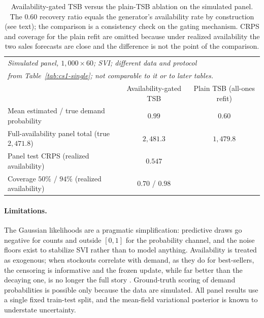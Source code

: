 \begin{table}[t]
\centering
\small
\begin{tabular}{lcc}
\toprule
\multicolumn{3}{l}{\emph{Simulated panel, $1{,}000 \times 60$; SVI; different data and protocol}} \\
\multicolumn{3}{l}{\emph{from Table~\ref{tab:cs1-single}; not comparable to it or to later tables.}} \\
\midrule
 & Availability-gated TSB & Plain TSB (all-ones refit) \\
\midrule
Mean estimated / true demand probability & $0.99$ & $0.60$ \\
Full-availability panel total (true $2{,}471.8$) & $2{,}481.3$ & $1{,}479.8$ \\
Panel test CRPS (realized availability) & $0.547$ & \\
Coverage $50\%$ / $94\%$ (realized availability) & $0.70$ / $0.98$ & \\
\bottomrule
\end{tabular}
\caption{Availability-gated TSB versus the plain-TSB ablation on the simulated panel. The $0.60$ recovery ratio equals the generator's availability rate by construction (see text); the comparison is a consistency check on the gating mechanism. CRPS and coverage for the plain refit are omitted because under realized availability the two sales forecasts are close and the difference is not the point of the comparison.}
\label{tab:cs1-panel}
\end{table}

\paragraph{Limitations.}
The Gaussian likelihoods are a pragmatic simplification: predictive draws go negative for counts and outside $[0,1]$ for the probability channel, and the noise floors exist to stabilize SVI rather than to model anything. Availability is treated as exogenous; when stockouts correlate with demand, as they do for best-sellers, the censoring is informative and the frozen update, while far better than the decaying one, is no longer the full story \citep{braden1991informational}. Ground-truth scoring of demand probabilities is possible only because the data are simulated. All panel results use a single fixed train-test split, and the mean-field variational posterior is known to understate uncertainty.
